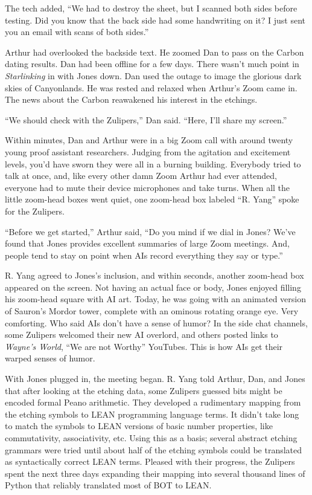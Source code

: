 The tech added, ``We had to destroy the sheet, but I scanned both sides
before testing. Did you know that the back side had some handwriting on
it? I just sent you an email with scans of both sides.''

Arthur had overlooked the backside text. He zoomed Dan to pass on the
Carbon dating results. Dan had been offline for a few days. There wasn't
much point in \emph{Starlinking} in with Jones down. Dan used the outage
to image the glorious dark skies of Canyonlands. He was rested and
relaxed when Arthur's Zoom came in. The news about the Carbon reawakened
his interest in the etchings.

``We should check with the Zulipers,'' Dan said. ``Here, I'll share my
screen.''

Within minutes, Dan and Arthur were in a big Zoom call with around
twenty young proof assistant researchers. Judging from the agitation and
excitement levels, you'd have sworn they were all in a burning building.
Everybody tried to talk at once, and, like every other damn Zoom Arthur
had ever attended, everyone had to mute their device microphones and
take turns. When all the little zoom-head boxes went quiet, one
zoom-head box labeled ``R. Yang'' spoke for the Zulipers.

``Before we get started,'' Arthur said, ``Do you mind if we dial in
Jones? We've found that Jones provides excellent summaries of large Zoom
meetings. And, people tend to stay on point when AIs record everything
they say or type.''

R. Yang agreed to Jones's inclusion, and within seconds, another
zoom-head box appeared on the screen. Not having an actual face or body,
Jones enjoyed filling his zoom-head square with AI art. Today, he was
going with an animated version of Sauron's Mordor tower, complete with
an ominous rotating orange eye. Very comforting. Who said AIs don't have
a sense of humor? In the side chat channels, some Zulipers welcomed
their new AI overlord, and others posted links to \emph{Wayne's World},
``We are not Worthy'' YouTubes. This is how AIs get their warped senses
of humor.

With Jones plugged in, the meeting began. R. Yang told Arthur, Dan, and
Jones that after looking at the etching data, some Zulipers guessed bits
might be encoded formal Peano arithmetic. They developed a rudimentary
mapping from the etching symbols to LEAN programming language terms. It
didn't take long to match the symbols to LEAN versions of basic number
properties, like commutativity, associativity, etc. Using this as a
basis; several abstract etching grammars were tried until about half of
the etching symbols could be translated as syntactically correct LEAN
terms. Pleased with their progress, the Zulipers spent the next three
days expanding their mapping into several thousand lines of Python that
reliably translated most of BOT to LEAN.


